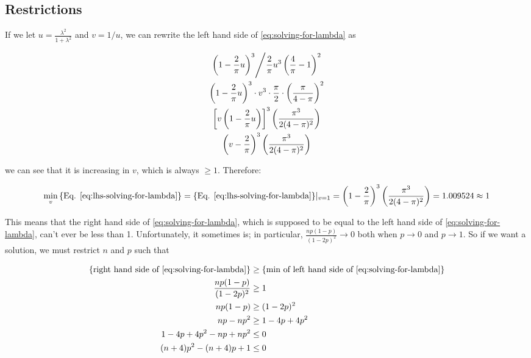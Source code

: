 \documentclass{article}
\begin{document}
\subsection{Restrictions}

If we let $u = \frac{\lambda^2}{1+\lambda^2}$ and $v = 1/u$, we can rewrite the
left hand side of \eqref{eq:solving-for-lambda} as

\begin{gather}
  \left. \left( 1 - \frac{2}{\pi} u \right)^3 \middle/ \frac{2}{\pi} u^3 \left( \frac{4}{\pi} - 1 \right)^2 \right. \nonumber \\
  \left( 1 - \frac{2}{\pi} u \right)^3 \cdot v^3 \cdot \frac{\pi}{2} \cdot \left( \frac{\pi}{4-\pi} \right)^2 \nonumber \\
  \left[ v \left( 1 - \frac{2}{\pi} u \right) \right]^3 \left( \frac{\pi^3}{2(4-\pi)^2} \right) \nonumber \\
  \left( v - \frac{2}{\pi} \right)^3 \left( \frac{\pi^3}{2(4-\pi)^2} \right) \label{eq:lhs-solving-for-lambda}
\end{gather}

we can see that it is increasing in $v$, which is always $\geq 1$. Therefore:

\begin{equation}
  \min_{v} \textnormal{\{Eq. \eqref{eq:lhs-solving-for-lambda}\}} = \textnormal{\{Eq. \eqref{eq:lhs-solving-for-lambda}\}} |_{v=1} = 
  \left( 1 - \frac{2}{\pi} \right)^3 \left( \frac{\pi^3}{2(4-\pi)^2} \right) = 1.009524 \approx 1
\end{equation}

This means that the right hand side of \eqref{eq:solving-for-lambda}, which is
supposed to be equal to the left hand side of \eqref{eq:solving-for-lambda},
can't ever be less than 1. Unfortunately, it sometimes is; in particular,
$\frac{np(1-p)}{(1-2p)^2} \rightarrow 0$ both when $p \rightarrow 0$ and $p
\rightarrow 1$. So if we want a solution, we must restrict $n$ and $p$ such
that

\begin{align}
  \textnormal{\{right hand side of \eqref{eq:solving-for-lambda}\}} &\geq \textnormal{\{min of left hand side of \eqref{eq:solving-for-lambda}\}} \nonumber \\
  \frac{np(1-p)}{(1-2p)^2} &\geq 1 \nonumber \\
  np(1-p) &\geq (1-2p)^2 \nonumber \\
  np - np^2 &\geq 1 - 4p + 4p^2 \nonumber \\
  1 - 4p + 4p^2 - np + np^2 &\leq 0 \nonumber \\
  (n+4)p^2 - (n+4)p + 1 &\leq 0 \label{eq:solving-the-restriction}
\end{align}
\end{document}
